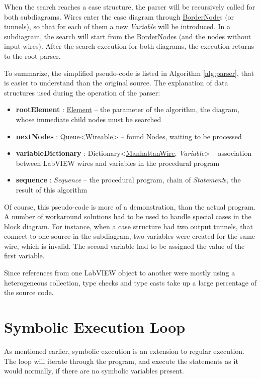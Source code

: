 When the search reaches a case structure, the parser will be recursively called for both subdiagrams. Wires enter the case diagram through \underline{BorderNode}s (or tunnels), so that for each of them a new \textit{Variable} will be introduced. In a subdiagram, the search will start from the \underline{BorderNode}s (and the nodes without input wires). After the search execution for both diagrams, the execution returns to the root parser.

To summarize, the simplified pseudo-code is listed in Algorithm \ref{alg:parser}, that is easier to understand than the original source. 
The explanation of data structures used during the operation of the parser:

\begin{itemize}
\item \textbf{rootElement} : \underline{Element} -- the parameter of the algorithm, the diagram, whose immediate child nodes must be searched
\item \textbf{nextNodes} : Queue<\underline{Wireable}> -- found \underline{Nodes}, waiting to be processed
\item \textbf{variableDictionary} : Dictionary<\underline{ManhattanWire}, \textit{Variable}> -- association between LabVIEW wires and variables in the procedural program
\item \textbf{sequence} : \textit{Sequence} -- the procedural program, chain of \textit{Statement}s, the result of this algorithm
\end{itemize}



Of course, this pseudo-code is more of a demonstration, than the actual program. A number of workaround solutions had to be used to handle special cases in the block diagram. For instance, when a case structure had two output tunnels, that connect to one source in the subdiagram, two variables were created for the same wire, which is invalid. The second variable had to be assigned the value of the first variable.

Since references from one LabVIEW object to another were mostly using a heterogeneous collection, type checks and type casts take up a large percentage of the source code.

\section{Symbolic Execution Loop}

As mentioned earlier, symbolic execution is an extension to regular execution. The loop will iterate through the program, and execute the statements as it would normally, if there are no symbolic variables present.

